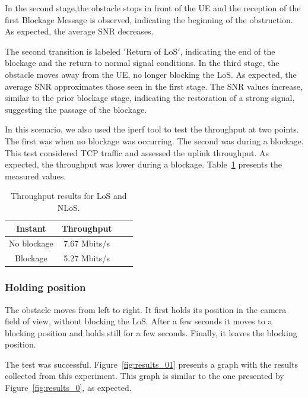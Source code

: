 In the second stage,the obstacle stops in front of the UE and the reception of the first Blockage Message is observed, indicating the beginning of the obstruction.
As expected, the average SNR decreases.

The second transition is labeled \('\)Return of LoS\('\), indicating the end of the blockage and the return to normal signal conditions.
In the third stage, the obstacle moves away from the UE, no longer blocking the LoS\@.
As expected, the average SNR approximates those seen in the first stage.
The SNR values increase, similar to the prior blockage stage, indicating the restoration of a strong signal, suggesting the passage of the blockage.

In this scenario, we also used the iperf tool to test the throughput at two points.
The first was when no blockage was occurring.
The second was during a blockage.
This test considered TCP traffic and assessed the uplink throughput.
As expected, the throughput was lower during a blockage.
Table~\ref{tab:iperf} presents the measured values.


\begin{table}[h]
    \centering %
    \begin{tabular}{|c|c|c|c|}
        \hline
        \textbf{Instant} & \textbf{Throughput} \\ \hline
        No blockage & 7.67 Mbits/s \\ \hline
        Blockage   &  5.27 Mbits/s \\ \hline
    \end{tabular}
    \caption{Throughput results for LoS and NLoS.} %
    \label{tab:iperf} %
\end{table}

\subsubsection{Holding position}

The obstacle moves from left to right.
It first holds its position in the camera field of view, without blocking the LoS\@.
After a few seconds it moves to a blocking position and holds still for a few seconds.
Finally, it leaves the blocking position.

The test was successful.
Figure~\ref{fig:results_01} presents a graph with the results collected from this experiment.
This graph is similar to the one presented by Figure~\ref{fig:results_0}, as expected.

